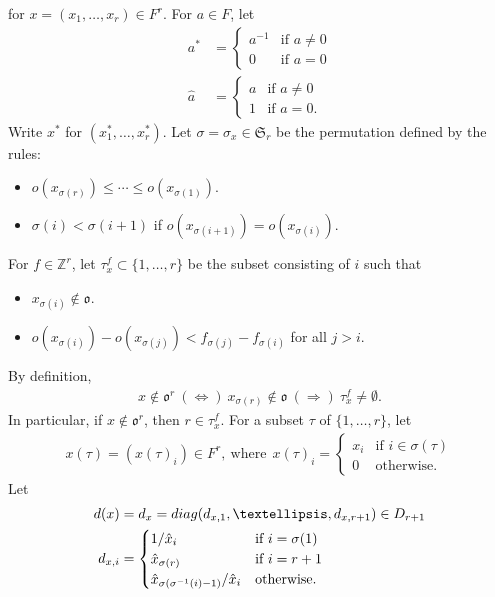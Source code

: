 \documentclass[11pt]{amsart}
\newcommand\s{\sigma}%
\newcommand\oo{\mathfrak{o}}
\newcommand\Sf{{\mathfrak{S}}}
\newcommand\Z{{\mathbb{Z}}}
\newcommand\1{\mathbf{1}}
\newcommand\diag{{\rm diag}}
\numberwithin{equation}{section}
\begin{document}
for $x = (x_1, \ldots, x_{r}) \in F^{r}$.
For $a \in F$, let
\begin{align*}
a^* &= \begin{cases}
a^{-1} & \mbox{if $a \neq 0$} \\
0 & \mbox{if $a = 0$} 
\end{cases} \\
\hat{a} &= \begin{cases}
a & \mbox{if $a \neq 0$} \\
1 & \mbox{if $a = 0$.}
\end{cases}
\end{align*} 
Write $x^*$ for $(x_1^*, \ldots, x_r^*)$.
Let $\s = \s_x \in \Sf_{r}$ be the permutation defined by the rules: 
\begin{itemize}
\item $o(x_{\s(r)}) \le \cdots \le o(x_{\s(1)})$.
\item $\s(i) < \s(i+1)$ if $o(x_{\s(i+1)}) = o(x_{\s(i)})$.
\end{itemize}
For $f \in \Z^{r}$, let $\tau_x^f \subset \{1, \ldots, r \}$ be the subset consisting of $i$ such that
\begin{itemize}
\item $x_{\s(i)} \not\in \oo$.
\item $o(x_{\s(i)}) -o(x_{\s(j)}) < f_{\s(j)} - f_{\s(i)} $ for all $j > i$.
\end{itemize}
By definition, 
\begin{align}
 x \not\in \oo^r \ (\Longleftrightarrow) \ x_{\s(r)} \not\in \oo \ (\Longrightarrow) \ \tau_x^f \neq \emptyset. \label{eqv:xo}
\end{align} 
In particular, if $x \not\in \oo^r$, then $r \in \tau_x^f$.
For a subset $\tau$ of $\{1, \ldots, r \}$, let
\begin{align*}
x(\tau) = (x(\tau)_i) \in F^{r}, \ \mbox{where} \ \ 
x(\tau)_i = 
\begin{cases}
x_i & \mbox{if $i \in \s(\tau)$} \\
0 & \mbox{otherwise}.
\end{cases}
\end{align*} 
Let 
\begin{align}
d(x) &= d_x = \diag(d_{x,1}, \ldots, d_{x,r+1}) \in D_{r+1}\notag \\
d_{x,i} &= \begin{cases}
1/\hat{x}_{i} & \mbox{if $i = \s(1)$} \\
\hat{x}_{\s(r)}& \mbox{if $i = r+1$} \\
\hat{x}_{\s(\s^{-1}(i)-1)}/\hat{x}_{i} & \mbox{otherwise}.
\end{cases}
\label{def:dxi}
\end{align}
\end{document}
